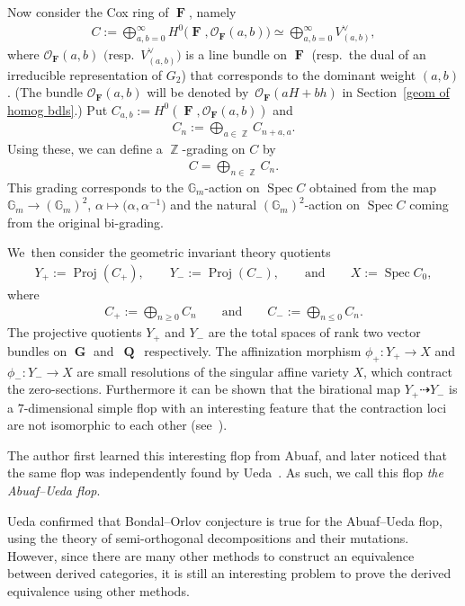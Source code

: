 \documentclass[10pt,a4paper]{amsart}
\DeclareMathOperator{\F}{\mathbf{F}}
\newcommand{\Gm}{\mathbb{G}_{m}}
\DeclareMathOperator{\G}{\mathbf{G}}
\DeclareMathOperator{\Proj}{Proj}
\DeclareMathOperator{\Q}{\mathbf{Q}}
\DeclareMathOperator{\Spec}{Spec}
\DeclareMathOperator{\ZZ}{\mathbb{Z}}
\newcommand{\stsh}{\mathcal{O}}
\numberwithin{equation}{section}
\begin{document}
Now consider the Cox ring of $\F$, namely
\begin{gather*}
C := \bigoplus_{a, b = 0}^{\infty} H^0\big(\F, \stsh_{\F}(a, b)\big) \simeq \bigoplus_{a, b = 0}^{\infty} V_{(a, b)}^{\vee},
\end{gather*}
where $\stsh_{\F}(a, b)$ $\big($resp.~$V_{(a, b)}^{\vee}\big)$ is a line bundle on $\F$ (resp.~the dual of an irreducible representation of $G_2$)
that corresponds to the dominant weight $(a, b)$.
(The bundle $\stsh_{\F}(a, b)$ will be denoted by~$\stsh_{\F}(aH + bh)$ in Section~\ref{geom of homog bdls}.)
Put $C_{a, b} := H^0(\F, \stsh_{\F}(a, b))$ and
\begin{gather*}
C_n := \bigoplus_{a \in \ZZ} C_{n + a, a}.
\end{gather*}
Using these, we can define a $\ZZ$-grading on $C$ by
\begin{gather*}
C = \bigoplus_{n \in \ZZ} C_n.
\end{gather*}
This grading corresponds to the $\Gm$-action on $\Spec C$ obtained from the map $\Gm \to (\Gm)^2$, $\alpha \mapsto \big(\alpha, \alpha^{-1}\big)$
and the natural $(\Gm)^2$-action on $\Spec C$ coming from the original bi-grading.

We~then consider the geometric invariant theory quotients
\begin{gather*}
Y_+ := \Proj(C_+),\qquad
Y_- := \Proj(C_-),\qquad \text{and} \qquad
X := \Spec C_0,
\end{gather*}
where
\begin{gather*}
C_+ := \bigoplus_{n \geq 0} C_n \qquad \text{and} \qquad C_- := \bigoplus_{n \leq 0} C_n.
\end{gather*}
The projective quotients $Y_+$ and $Y_-$ are the total spaces of rank two vector bundles on $\G$ and~$\Q$~respectively.
The affinization morphism $\phi_+\colon Y_+ \to X$ and $\phi_-\colon Y_- \to X$ are small resolutions of the singular affine variety $X$,
which contract the zero-sections.
Furthermore it can be shown that the birational map $Y_+ \dashrightarrow Y_-$ is a $7$-dimensional simple flop with an interesting feature
that the contraction loci are not isomorphic to each other (see~\cite{Ued16}).

The author first learned this interesting flop from Abuaf,
and later noticed that the same flop was independently found by Ueda~\cite{Ued16}.
As such, we call this flop \textit{the Abuaf--Ueda flop}.

Ueda confirmed that Bondal--Orlov conjecture is true for the Abuaf--Ueda flop, using the theory of semi-orthogonal decompositions and their mutations.
However, since there are many other methods to construct an equivalence between derived categories,
it is still an interesting problem to prove the derived equivalence using other methods.
\end{document}
